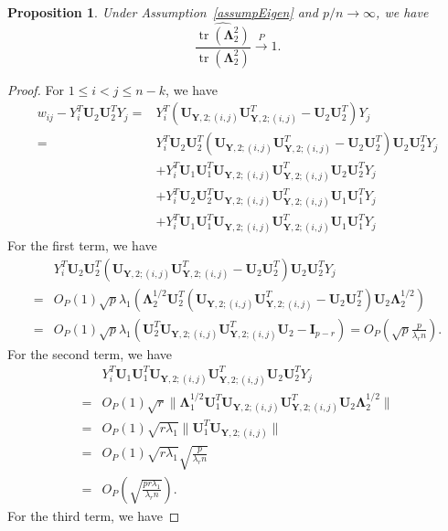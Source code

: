 \documentclass[12pt]{article} %
\DeclareMathOperator{\mytr}{tr}
\newcommand{\bY}{\mathbf{Y}}
\newcommand{\bI}{\mathbf{I}}
\newcommand{\bU}{\mathbf{U}}
\newcommand{\bfsym}[1]{\ensuremath{\boldsymbol{#1}}}
\def\bLambda {\bfsym {\Lambda}}
\newtheorem{proposition}{Proposition}
\theoremstyle{definition}
\begin{document}
\begin{proposition}
    Under Assumption~\eqref{assumpEigen} and $p/n\to \infty$, we have
    $$
    \frac{\widehat{\mytr(\bLambda^2_2)}}{\mytr(\bLambda^2_2)} \xrightarrow{P} 1.
    $$

\end{proposition}
\begin{proof}
For $1\leq i<j\leq n-k$, we have
$$
    \begin{aligned}
        w_{ij}-Y_i^T \bU_{2} \bU_{2}^T Y_j
        =&Y_i^T (\bU_{\bY,2;(i,j)} \bU_{\bY,2;(i,j)}^T-\bU_2 \bU_2^T) Y_j\\
        =&Y_i^T \bU_2 \bU_2^T (\bU_{\bY,2;(i,j)} \bU_{\bY,2;(i,j)}^T-\bU_2\bU_2^T) \bU_2 \bU_2^T Y_j\\
        &+Y_i^T \bU_1 \bU_1^T \bU_{\bY,2;(i,j)} \bU_{\bY,2;(i,j)}^T \bU_2 \bU_2^T Y_j\\
        &+Y_i^T \bU_2 \bU_2^T \bU_{\bY,2;(i,j)} \bU_{\bY,2;(i,j)}^T \bU_1 \bU_1^T Y_j\\
        &+Y_i^T \bU_1 \bU_1^T \bU_{\bY,2;(i,j)} \bU_{\bY,2;(i,j)}^T \bU_1 \bU_1^T Y_j
    \end{aligned}
$$
For the first term, we have
$$
        \begin{aligned}
        &Y_i^T \bU_2 \bU_2^T (\bU_{\bY,2;(i,j)} \bU_{\bY,2;(i,j)}^T-\bU_2\bU_2^T) \bU_2 \bU_2^T Y_j\\
        =&O_P(1)\sqrt{p}
            \lambda_1(\bLambda_2^{1/2}\bU_2^T (\bU_{\bY,2;(i,j)} \bU_{\bY,2;(i,j)}^T-\bU_2\bU_2^T) \bU_2 \bLambda_2^{1/2})\\
        =&O_P(1)\sqrt{p}
            \lambda_1(\bU_2^T \bU_{\bY,2;(i,j)} \bU_{\bY,2;(i,j)}^T\bU_2-\bI_{p-r})
            =O_P(\sqrt{p}\frac{p}{\lambda_r n}).
        \end{aligned}
    $$
    For the second term, we have
    $$
    \begin{aligned}
        &Y_i^T \bU_1 \bU_1^T \bU_{\bY,2;(i,j)} \bU_{\bY,2;(i,j)}^T \bU_2 \bU_2^T Y_j\\
        =&
        O_P(1)\sqrt{r}\|\bLambda_1^{1/2}\bU_1^T \bU_{\bY,2;(i,j)}\bU_{\bY,2;(i,j)}^T \bU_2 \bLambda_2^{1/2}\|\\
        =&
        O_P(1)\sqrt{r\lambda_1}\|\bU_1^T \bU_{\bY,2;(i,j)}\|\\
        =&
        O_P(1)\sqrt{r\lambda_1}\sqrt{\frac{p}{\lambda_r n}}\\
        =&
        O_P(\sqrt{\frac{pr \lambda_1}{\lambda_r n}}).
    \end{aligned}
    $$
    For the third term, we have

\end{proof}
\end{document}

